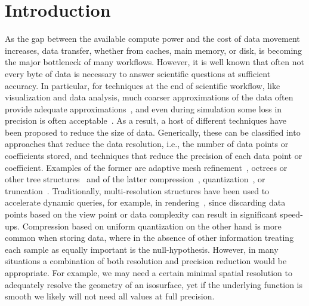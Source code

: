 \section{Introduction}

As the gap between the available compute power and the cost of data
movement increases, data transfer, whether from caches, main memory,
or disk, is becoming the major bottleneck of many workflows. However,
it is well known that often not every byte of data is necessary to
answer scientific questions at sufficient accuracy.
In particular, for techniques at the end of scientific
workflow, like visualization and data analysis, much coarser
approximations of the data often provide adequate approximations~\cite{woodring2011,covra2012,compression_sim2013},
               and even during simulation some loss in precision is often
               acceptable~\cite{compression_sim2013}. As a result, a host of different
               techniques have been proposed to reduce the size of data. Generically,
               these can be classified into approaches that reduce the data
               resolution, i.e., the number of data points or coefficients stored, and
               techniques that reduce the precision of each data point or coefficient.
               Examples of the former are
               adaptive mesh refinement~\cite{amr1989}, octrees or other tree
               structures~\cite{hierarchical1984} and of the latter compression~\cite{zfp2014},
               quantization~\cite{vq1992}, or truncation~\cite{?}.
               Traditionally,
               multi-resolution structures have been used to accelerate dynamic
               queries, for example, in rendering~\cite{multires_octree1999}, since discarding data points
               based on the view point or data complexity can result in significant
               speed-ups. Compression based on uniform quantization on the other hand is
               more common when storing data, where in the absence of other
               information treating each sample as equally important is the
               null-hypothesis. However, in many situations a combination of both
               resolution and precision reduction would be appropriate.
               For example, we may need a certain minimal
               spatial resolution to adequately resolve the geometry of an isosurface,
               yet if the underlying function is smooth we likely will not need all values
               at full precision.
